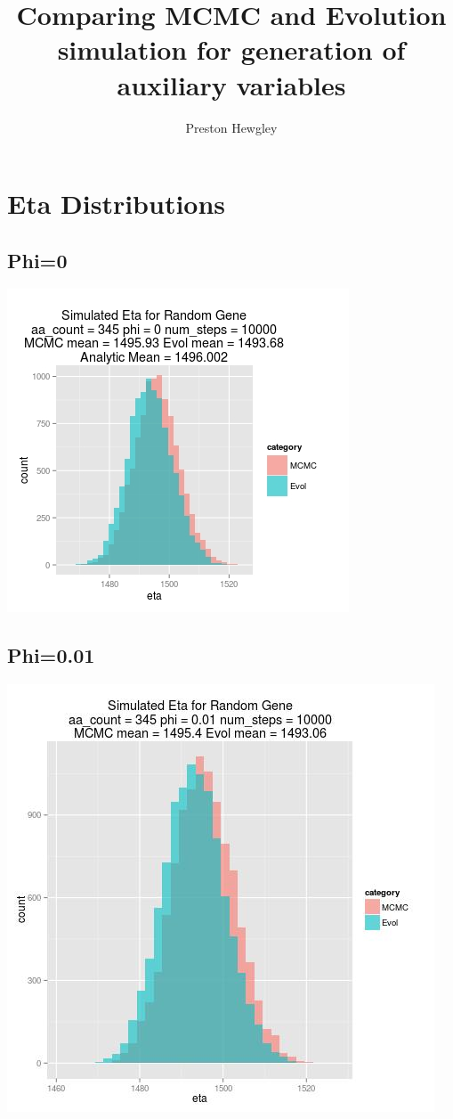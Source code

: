 \documentclass{article}
\title{\textbf{Comparing MCMC and Evolution simulation for generation of auxiliary variables}}
\author{Preston Hewgley}
\begin{document}
\maketitle

\section{Eta Distributions}

\subsection{Phi=0}
\includegraphics[scale=.65]{0_phi.jpg}
\subsection{Phi=0.01}
\includegraphics[scale=.5]{001_phi.jpg}
\end{document}
